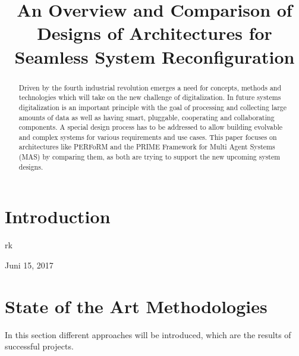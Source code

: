 \documentclass[conference,compsoc]{IEEEtran}
\begin{document}
%
\title{An Overview and Comparison of Designs of Architectures for Seamless System Reconfiguration}


\author{
}

\maketitle

\begin{abstract}
Driven by the fourth industrial revolution emerges a need for concepts, methods and technologies which will take on the new challenge of digitalization. In future systems digitalization is an important principle with the goal of processing and collecting large amounts of data as well as having smart, pluggable, cooperating and collaborating components. A special design process has to be addressed to allow building evolvable and complex systems for various requirements and use cases. This paper focuses on architectures like PERFoRM and the PRIME Framework for Multi Agent Systems (MAS) by comparing them, as both are trying to support the new upcoming system designs.
\end{abstract}

\section{Introduction} %

\lipsum[1-6]


\hfill rk

\hfill Juni 15, 2017


\IEEEpeerreviewmaketitle

\section{State of the Art Methodologies} %
In this section different approaches will be introduced, which are the results of successful projects. 
\end{document}
